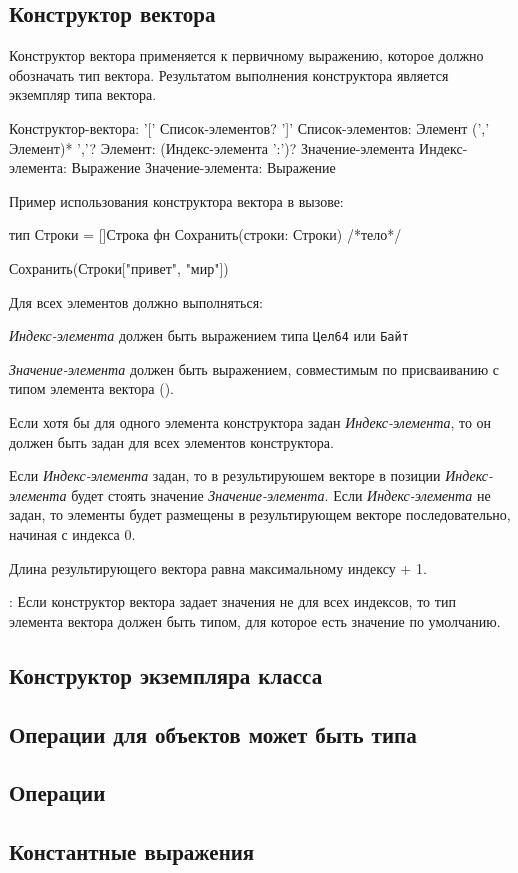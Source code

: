 \hypertarget{vector-composite}{%
\subsection{Конструктор вектора}\label{expr:vector-composite}}

Конструктор вектора применяется к первичному выражению, которое должно обозначать тип вектора. Результатом выполнения конструктора является экземпляр типа вектора.

\begin{Grammar}
Конструктор-вектора: '[' Список-элементов? ']' 
Список-элементов: Элемент (',' Элемент)* ','?
Элемент: (Индекс-элемента ':')? Значение-элемента
Индекс-элемента: Выражение
Значение-элемента: Выражение
\end{Grammar}   

Пример использования конструктора вектора в вызове:
\begin{Trivil}[vspace=2pt]
тип Строки = []Строка
фн Сохранить(строки: Строки) { /*тело*/ }

Сохранить(Строки["привет", "мир"])
\end{Trivil}

Для всех элементов должно выполняться:
\begin{d_itemize}
\item
    \emph{Индекс-элемента} должен быть выражением типа \verb|Цел64| или \verb|Байт|
\item
    \emph{Значение-элемента} должен быть выражением, совместимым по присваиванию с типом элемента вектора ().
\end{d_itemize}

Если хотя бы для одного элемента конструктора задан \emph{Индекс-элемента}, то он должен быть задан для всех элементов конструктора.

Если \emph{Индекс-элемента} задан, то в результируюшем векторе в позиции \emph{Индекс-элемента} будет стоять значение \emph{Значение-элемента}.
Если \emph{Индекс-элемента} не задан, то элементы будет размещены в результирующем векторе последовательно, начиная с индекса 0.

Длина результирующего вектора равна максимальному индексу + 1.

\TBD: Если конструктор вектора задает значения не для всех индексов, то тип элемента вектора должен быть типом, для которое есть значение по умолчанию.

\hypertarget{class-composite}{%
\subsection{Конструктор экземпляра класса}\label{expr:class-composite}}

\hypertarget{mb-ops}{%
\subsection{Операции для объектов может быть типа}\label{expr:mb-ops}}

\hypertarget{operators}{%
\subsection{Операции}\label{expr:operators}}

\hypertarget{const-expr}{%
\subsection{Константные выражения}\label{expr:const-expr}}